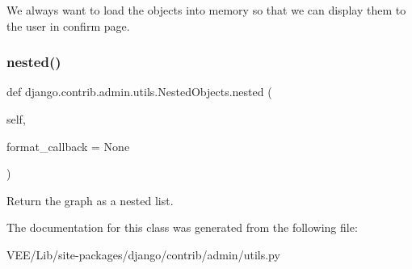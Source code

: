 \begin{DoxyVerb}We always want to load the objects into memory so that we can display
them to the user in confirm page.
\end{DoxyVerb}
 \mbox{\label{classdjango_1_1contrib_1_1admin_1_1utils_1_1_nested_objects_afbdc67f5d571f29ac802a0ed270238a3}} 
\subsubsection{\texorpdfstring{nested()}{nested()}}
{\footnotesize\ttfamily def django.\+contrib.\+admin.\+utils.\+Nested\+Objects.\+nested (\begin{DoxyParamCaption}\item[{}]{self,  }\item[{}]{format\+\_\+callback = {\ttfamily None} }\end{DoxyParamCaption})}

\begin{DoxyVerb}Return the graph as a nested list.
\end{DoxyVerb}
 

The documentation for this class was generated from the following file\+:\begin{DoxyCompactItemize}
\item 
V\+E\+E/\+Lib/site-\/packages/django/contrib/admin/utils.\+py\end{DoxyCompactItemize}
